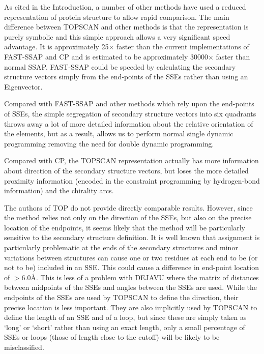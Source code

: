 \documentclass{article}
\begin{document}
As cited in the Introduction, a number of other methods have used a
reduced representation of protein structure to allow rapid comparison.
The main difference between TOPSCAN and other methods is that the
representation is purely symbolic and this simple approach allows a
very significant speed advantage. It is approximately 25$\times$
faster than the current implementations of
FAST-SSAP\cite{taylor:alignment} and
CP\cite{David_Gilbert_David_Westhead} and is estimated to be
approximately 30000$\times$ faster than normal SSAP.  FAST-SSAP could
be speeded by calculating the secondary structure vectors simply from
the end-points of the SSEs rather than using an Eigenvector.

Compared with FAST-SSAP and other methods which rely upon the
end-points of SSEs, the simple segregation of secondary structure
vectors into six quadrants throws away a lot of more detailed
information about the relative orientation of the elements, but as a
result, allows us to perform normal single dynamic programming
removing the need for double dynamic programming.

Compared with CP, the TOPSCAN representation actually has more
information about direction of the secondary structure vectors, but
loses the more detailed proximity information (encoded in the
constraint programming by hydrogen-bond information) and the chirality
arcs.

The authors of TOP\cite{lu:top} do not provide directly comparable
results.  However, since the method relies not only on the direction
of the SSEs, but also on the precise location of the endpoints, it
seems likely that the method will be particularly sensitive to the
secondary structure definition. It is well known that assignment is
particularly problematic at the ends of the secondary structures and
minor variations between structures can cause one or two residues at
each end to be (or not to be) included in an SSE. This could cause a
difference in end-point location of $>6.0$\AA. This is less of a
problem with DEJAVU\cite{kleywegt:dejavu} where the matrix of
distances between midpoints of the SSEs and angles between the SSEs
are used.  While the endpoints of the SSEs are used by TOPSCAN to
define the direction, their precise location is less important. They
are also implicitly used by TOPSCAN to define the length of an SSE and
of a loop, but since these are simply taken as `long' or `short'
rather than using an exact length, only a small percentage of SSEs or
loops (those of length close to the cutoff) will be likely to be
misclassified.
\end{document}
